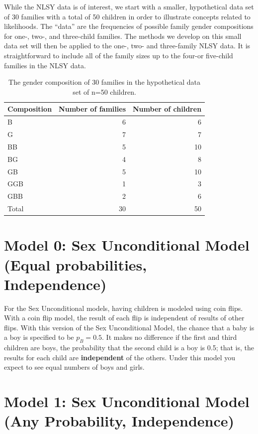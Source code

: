 \documentclass[
]{krantz}
\begin{document}
While the NLSY data is of interest, we start with a smaller, hypothetical data set of 30 families with a total of 50 children in order to illustrate concepts related to likelihoods. The ``data'' are the frequencies of possible family gender compositions for one-, two-, and three-child families. The methods we develop on this small data set will then be applied to the one-, two- and three-family NLSY data. It is straightforward to include all of the family sizes up to the four-or five-child families in the NLSY data.

\begin{table}[t]

\caption{\label{tab:table1chp2}The gender composition of 30 families in the hypothetical data set of n=50 children.}
\centering
\begin{tabular}{lrr}
\toprule
Composition & Number of families & Number of children\\
\midrule
B & 6 & 6\\
G & 7 & 7\\
BB & 5 & 10\\
BG & 4 & 8\\
GB & 5 & 10\\
\addlinespace
GGB & 1 & 3\\
GBB & 2 & 6\\
Total & 30 & 50\\
\bottomrule
\end{tabular}
\end{table}

\hypertarget{model-0-sex-unconditional-model-equal-probabilities-independence}{%
\section{Model 0: Sex Unconditional Model (Equal probabilities, Independence)}\label{model-0-sex-unconditional-model-equal-probabilities-independence}}

For the Sex Unconditional models, having children is modeled using coin flips. With a coin flip model, the result of each flip is independent of results of other flips. With this version of the Sex Unconditional Model, the chance that a baby is a boy is specified to be \(p_B=0.5\). It makes no difference if the first and third children are boys, the probability that the second child is a boy is 0.5; that is, the results for each child are \textbf{independent} of the others. Under this model you expect to see equal numbers of boys and girls.

\hypertarget{sex_unconditional_model}{%
\section{Model 1: Sex Unconditional Model (Any Probability, Independence)}\label{sex_unconditional_model}}
\end{document}
